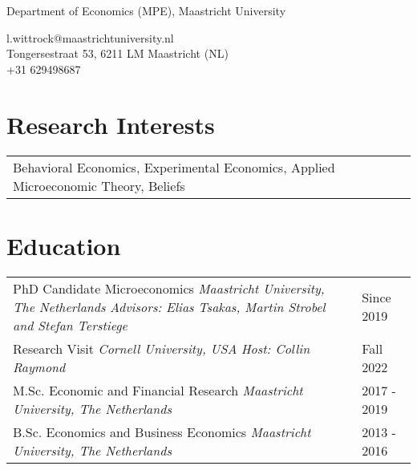 \documentclass[11pt]{article}
\begin{document}
 

\pagestyle{empty} 

\par{\par}  
\parskip 12pt

\begin{center}
		Department of Economics (MPE), Maastricht University 	\\
		\rule{0pt}{4ex} \faSendO{} l.wittrock@maastrichtuniversity.nl \\
 								\Letter{} Tongersestraat 53, 6211 LM Maastricht (NL) \\
 								\faPhone{} +31 629498687
 \end{center}
	
\vspace*{1em}

\section{Research Interests}

\noindent\begin{tabular}{L{16cm}}
 Behavioral Economics, Experimental Economics, Applied Microeconomic Theory, Beliefs
\end{tabular}


\section{Education}
\noindent\begin{tabular}{L{14cm}L{3cm}}
PhD Candidate Microeconomics \newline \textit{Maastricht University, The Netherlands}	\newline \textit{Advisors: Elias Tsakas, Martin Strobel and Stefan Terstiege} & Since 2019   \\
\rule{0pt}{4ex}Research Visit  \newline \textit{Cornell University, USA} \newline \textit{Host: Collin Raymond} & Fall 2022  \\
\rule{0pt}{4ex}M.Sc. Economic and Financial Research  \newline \textit{Maastricht University, The Netherlands}  & 2017 - 2019  \\
\rule{0pt}{4ex}B.Sc. Economics and Business Economics  \newline \textit{Maastricht University, The Netherlands} 	& 2013 - 2016 	
\end{tabular}
\end{document}
